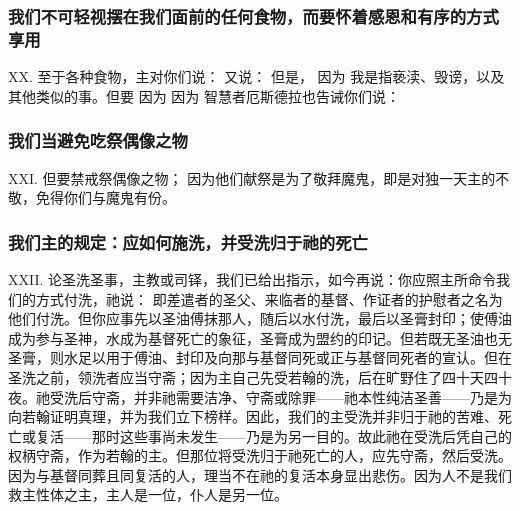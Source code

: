 
\subsubsection{我们不可轻视摆在我们面前的任何食物，而要怀着感恩和有序的方式享用}

XX. 至于各种食物，主对你们说： 又说： 但是， 因为  我是指亵渎、毁谤，以及其他类似的事。但要  因为  因为  智慧者厄斯德拉也告诫你们说： \par


\subsubsection{我们当避免吃祭偶像之物}

XXI. 但要禁戒祭偶像之物； 因为他们献祭是为了敬拜魔鬼，即是对独一天主的不敬，免得你们与魔鬼有份。\par


\subsubsection{我们主的规定：应如何施洗，并受洗归于祂的死亡}

XXII. 论圣洗圣事，主教或司铎，我们已给出指示，如今再说：你应照主所命令我们的方式付洗，祂说： 即差遣者的圣父、来临者的基督、作证者的护慰者之名为他们付洗。但你应事先以圣油傅抹那人，随后以水付洗，最后以圣膏封印；使傅油成为参与圣神，水成为基督死亡的象征，圣膏成为盟约的印记。但若既无圣油也无圣膏，则水足以用于傅油、封印及向那与基督同死或正与基督同死者的宣认。但在圣洗之前，领洗者应当守斋；因为主自己先受若翰的洗，后在旷野住了四十天四十夜。祂受洗后守斋，并非祂需要洁净、守斋或除罪——祂本性纯洁圣善——乃是为向若翰证明真理，并为我们立下榜样。因此，我们的主受洗并非归于祂的苦难、死亡或复活——那时这些事尚未发生——乃是为另一目的。故此祂在受洗后凭自己的权柄守斋，作为若翰的主。但那位将受洗归于祂死亡的人，应先守斋，然后受洗。因为与基督同葬且同复活的人，理当不在祂的复活本身显出悲伤。因为人不是我们救主性体之主，主人是一位，仆人是另一位。\par

